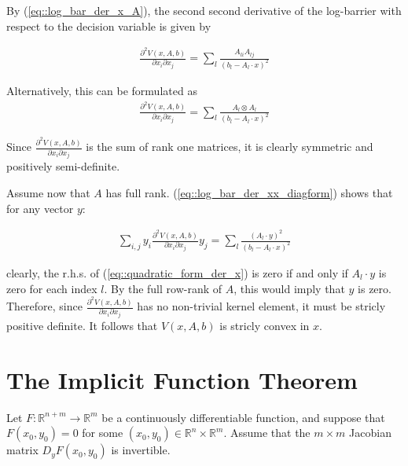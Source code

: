 \documentclass[12pt]{article}
\newcommand{\dotprod}[2]{#1\mathbin{\cdot}#2}
\newcommand{\pa}[1]{\left( #1 \right)}
\begin{document}
\label{appendix:: Strict_convexity}

By (\ref{eq::log_bar_der_x_A}), the second second derivative of the log-barrier with 
respect to the decision variable is given by

\begin{align}
    \nonumber
    \frac{\partial^2 V(x, A, b)}{\partial x_i \partial x_j} = \sum_l \frac{A_{li}A_{lj}}{\pa{b_l - \dotprod{A_l}{x}}^2}
\end{align}

Alternatively, this can be formulated as
\begin{align}
    \label{eq::log_bar_der_xx_diagform}
    \frac{\partial^2 V(x, A, b)}{\partial x_i \partial x_j} = \sum_l \frac{A_{l}\otimes A_{l}}{(b_l-\dotprod{A_l}{x})^2}
\end{align}

Since $\frac{\partial^2 V(x, A, b)}{\partial x_i \partial x_j}$ is the sum of rank one matrices, it is clearly symmetric and positively semi-definite.

Assume now that $A$ has full rank. (\ref{eq::log_bar_der_xx_diagform}) shows that for any vector $y$:

\begin{align}
    \label{eq::quadratic_form_der_x}
   \sum_{i,j}y_i \frac{\partial^2 V(x, A, b)}{\partial x_i \partial x_j}y_j = 
    \sum_l \frac{ \pa{\dotprod{A_{l}}{y}}^2 }{(b_l-\dotprod{A_l}{x})^2}
\end{align}

clearly, the r.h.s. of (\ref{eq::quadratic_form_der_x}) is zero if and only if $\dotprod{A_l}{y}$
is zero for each index $l$. By the full row-rank of $A$, this would imply that
$y$ is zero. Therefore, since $\frac{\partial^2 V(x, A, b)}
{\partial x_i \partial x_j}$ has no non-trivial kernel element, it must be stricly positive definite. 
It follows that $V(x,A,b)$ is stricly convex in $x$. 

\section{The Implicit Function Theorem}
\label{appendix:: Implicit_function_theorem}



Let \( F : \mathbb{R}^{n + m} \to \mathbb{R}^m \) be a continuously differentiable function, and suppose that \( F(x_0, y_0) = 0 \) for some \( (x_0, y_0) \in \mathbb{R}^n \times \mathbb{R}^m \). Assume that the \( m \times m \) Jacobian matrix \( D_y F(x_0, y_0) \) is invertible. 
\end{document}
